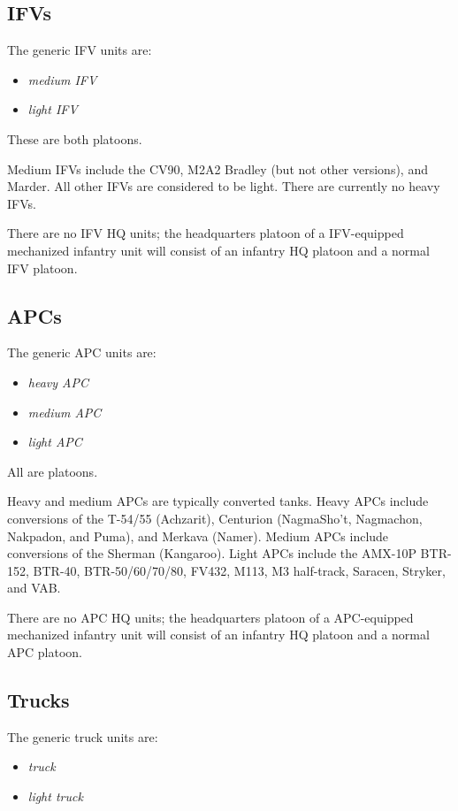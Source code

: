 \documentclass[10pt]{article}
\newcommand{\groundunittype}[1]{\subsection{#1}}
\begin{document}
\subsection{IFVs}

The generic IFV units are:
\begin{itemize}
\item \emph{medium IFV}
\item \emph{light IFV}
\end{itemize}

These are both platoons. 

Medium IFVs include the CV90, M2A2 Bradley (but not other versions), and Marder. All other IFVs are considered to be light. There are currently no heavy IFVs.

There are no IFV HQ units; the headquarters platoon of a IFV-equipped mechanized infantry unit will consist of an infantry HQ platoon and a normal IFV platoon.

\subsection{APCs}

The generic APC units are:
\begin{itemize}
\item \emph{heavy APC}
\item \emph{medium APC}
\item \emph{light APC}
\end{itemize}

All are platoons. 

Heavy and medium APCs are typically converted tanks. Heavy APCs include conversions of the
T-54/55 (Achzarit), Centurion (NagmaSho't, Nagmachon, Nakpadon, and Puma), and Merkava (Namer). Medium APCs include conversions of the Sherman (Kangaroo). Light APCs include the
AMX-10P
BTR-152,
BTR-40,
BTR-50/60/70/80,
FV432,
M113,
M3 half-track,
Saracen,
Stryker,
and 
VAB.

There are no APC HQ units; the headquarters platoon of a APC-equipped mechanized infantry unit will consist of an infantry HQ platoon and a normal APC platoon. 

\groundunittype{Trucks}

The generic truck units are:
\begin{itemize}
\item \emph{truck}
\item \emph{light truck}
\end{itemize}
\end{document}
